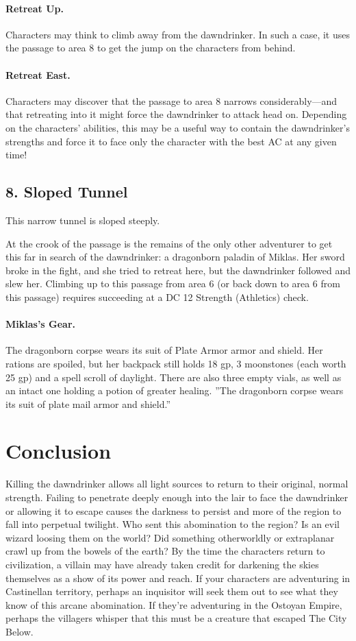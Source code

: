\documentclass[10pt,a4paper,twoside,twocolumn,openany,bg=print,nodeprecatedcode]{dndbook}
\begin{document}
\paragraph{Retreat Up.}
Characters may think to climb away from the dawndrinker. In such a case, it uses the passage to area 8 to get the jump on the characters from behind.
\paragraph{Retreat East.}
Characters may discover that the passage to area 8 narrows considerably—and that retreating into it might force the dawndrinker to attack head on. Depending on the characters' abilities, this may be a useful way to contain the dawndrinker's strengths and force it to face only the character with the best AC at any given time!
\subsection{8. Sloped Tunnel}
\begin{DndReadAloud}{}
This narrow tunnel is sloped steeply.
\end{DndReadAloud}

At the crook of the passage is the remains of the only other adventurer to get this far in search of the dawndrinker: a dragonborn paladin of Miklas. Her sword broke in the fight, and she tried to retreat here, but the dawndrinker followed and slew her.
Climbing up to this passage from area 6 (or back down to area 6 from this passage) requires succeeding at a DC 12 Strength (Athletics) check.
\paragraph{Miklas's Gear.}
The dragonborn corpse wears its suit of Plate Armor armor and shield. Her rations are spoiled, but her backpack still holds 18 gp, 3 moonstones (each worth 25 gp) and a spell scroll of daylight. There are also three empty vials, as well as an intact one holding a potion of greater healing.
\DndQuote%
{}
{''The dragonborn corpse wears its suit of plate mail armor and shield.''}
{}
\section{Conclusion}
Killing the dawndrinker allows all light sources to return to their original, normal strength. Failing to penetrate deeply enough into the lair to face the dawndrinker or allowing it to escape causes the darkness to persist and more of the region to fall into perpetual twilight.
Who sent this abomination to the region? Is an evil wizard loosing them on the world? Did something otherworldly or extraplanar crawl up from the bowels of the earth? By the time the characters return to civilization, a villain may have already taken credit for darkening the skies themselves as a show of its power and reach. If your characters are adventuring in Castinellan territory, perhaps an inquisitor will seek them out to see what they know of this arcane abomination. If they're adventuring in the Ostoyan Empire, perhaps the villagers whisper that this must be a creature that escaped The City Below.
\end{document}
